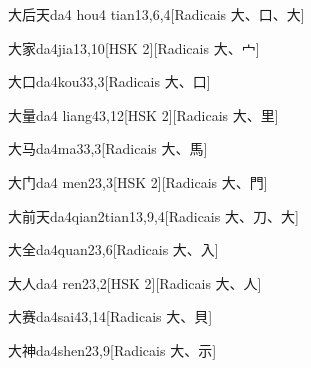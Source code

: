 \begin{entry}{大后天}{da4 hou4 tian1}{3,6,4}[Radicais ⼤、⼝、⼤]
\end{entry}

\begin{entry}{大家}{da4jia1}{3,10}[HSK 2][Radicais ⼤、⼧]
\end{entry}

\begin{entry}{大口}{da4kou3}{3,3}[Radicais ⼤、⼝]
\end{entry}

\begin{entry}{大量}{da4 liang4}{3,12}[HSK 2][Radicais ⼤、⾥]
\end{entry}

\begin{entry}{大马}{da4ma3}{3,3}[Radicais ⼤、⾺]
\end{entry}

\begin{entry}{大门}{da4 men2}{3,3}[HSK 2][Radicais ⼤、⾨]
\end{entry}

\begin{entry}{大前天}{da4qian2tian1}{3,9,4}[Radicais ⼤、⼑、⼤]
\end{entry}

\begin{entry}{大全}{da4quan2}{3,6}[Radicais ⼤、⼊]
\end{entry}

\begin{entry}{大人}{da4 ren2}{3,2}[HSK 2][Radicais ⼤、⼈]
\end{entry}

\begin{entry}{大赛}{da4sai4}{3,14}[Radicais ⼤、⾙]
\end{entry}

\begin{entry}{大神}{da4shen2}{3,9}[Radicais ⼤、⽰]
\end{entry}

